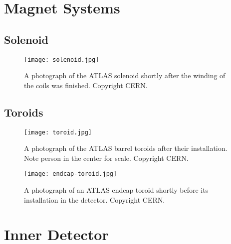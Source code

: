 







\section{Magnet Systems}

\subsection{Solenoid}


\begin{figure}
\centering
\texttt{[image: solenoid.jpg]}
\label{fig:detector:solenoid}
\caption{A photograph of the ATLAS solenoid shortly after the winding of the coils was finished. Copyright CERN.}
\end{figure}



\subsection{Toroids}



\begin{figure}
\centering
\texttt{[image: toroid.jpg]}
\label{fig:detector:solenoid}
\caption{A photograph of the ATLAS barrel toroids after their installation. Note person in the center for scale. Copyright CERN.}
\end{figure}





\begin{figure}
\centering
\texttt{[image: endcap-toroid.jpg]}
\label{fig:detector:solenoid}
\caption{A photograph of an ATLAS endcap toroid shortly before its installation in the detector. Copyright CERN.}
\end{figure}



\section{Inner Detector}


